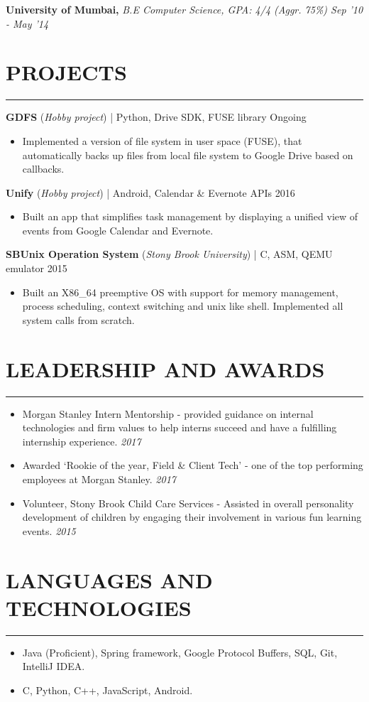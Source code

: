 \documentclass[12pt]{article}
\newcommand{\sectionHeading}[1]{
\section*{\small{#1}}
\vspace{-8pt}
\hrule
\vspace{8pt}
}
\newcommand {\projectSectionSubheading}[4]{
    \noindent \small{\textbf{#1} (\textit{#2}) | #4 \hfill #3}\vspace{-6pt}
}
\newcommand{\educationSectionSubheading}[3]{
    \noindent \small{\textbf{#1, }\textit{#2 \hfill #3}} \vspace{-20pt}\\
}
\newcommand{\sectionListStart}{
    \begin{itemize}[label={\small{\textbullet}}, leftmargin=20pt] %
}
\newcommand{\sectionListEnd}{\end{itemize}}
\newcommand{\sectionListItem}[1]{\item \small{#1}}
\newcommand{\sectionListItemWithDate}[2]{\item \small{#1 \hfill \textit{#2}} \\\vspace{-10pt}}
\begin{document}
\educationSectionSubheading
{University of Mumbai}{B.E Computer Science, GPA: 4/4 (Aggr. 75\%)}{Sep '10 - May '14}


\sectionHeading{PROJECTS}
\projectSectionSubheading{GDFS}{Hobby project}{Ongoing}{Python, Drive SDK, FUSE library}
\sectionListStart
    \sectionListItem
        Implemented a version of file system in user space (FUSE), that automatically backs up files from local file system to Google Drive based on callbacks. 
\sectionListEnd

\projectSectionSubheading{Unify}{Hobby project}{2016}{Android, Calendar \& Evernote APIs}
\sectionListStart
    \sectionListItem
        Built an app that simplifies task management by displaying a unified view of events from Google Calendar and Evernote.
\sectionListEnd

\projectSectionSubheading{SBUnix Operation System}{Stony Brook University}{2015}{C, ASM, QEMU emulator}
\sectionListStart
    \sectionListItem
        Built an X86\_64 preemptive OS with support for memory management, process scheduling, context switching and unix like shell. Implemented all system calls from scratch. 
        

\sectionListEnd

\sectionHeading{LEADERSHIP AND AWARDS}
\sectionListStart
    \sectionListItemWithDate
        {Morgan Stanley Intern Mentorship - provided guidance on internal technologies and firm values to help interns succeed and have a fulfilling internship experience.}{2017} 
    \sectionListItemWithDate
        {Awarded `Rookie of the year, Field \& Client Tech' - one of the top performing employees at Morgan Stanley.}{2017}
    \sectionListItemWithDate
        {Volunteer, Stony Brook Child Care Services - Assisted in overall personality development of children by engaging their involvement in various fun learning events.}{2015}
\sectionListEnd

\sectionHeading{LANGUAGES AND TECHNOLOGIES}
\sectionListStart
    \sectionListItem
        Java (Proficient), Spring framework, Google Protocol Buffers, SQL, Git, IntelliJ IDEA.
    \sectionListItem
        C, Python, C++, JavaScript, Android. 
\sectionListEnd

\end{document}
